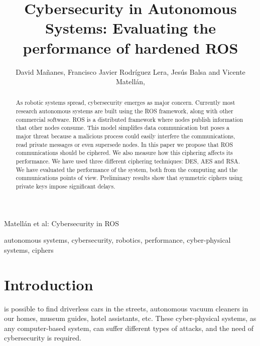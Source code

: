 \documentclass[journal,twoside]{JoPhA}
\begin{document}
\title{Cybersecurity in Autonomous Systems: Evaluating the performance of hardened ROS}

\author{David Ma\~nanes, Francisco Javier Rodr\'iguez Lera, Jes\'us Balsa and Vicente Matell\'an,
}

%
{Matell\'an et al: Cybersecurity in ROS}
\maketitle


\begin{abstract}
As robotic systems spread, cybersecurity emerges as major concern. Currently most research autonomous systems are built using the ROS framework, along with other commercial software. 
ROS is a distributed framework where nodes publish information that other nodes consume. 
This model simplifies data communication but poses a major threat because a malicious process could easily interfere the communications, read private messages or even supersede nodes. In this paper we propose that ROS communications should be ciphered. We also measure how this ciphering affects its performance. We have used three different ciphering techniques: DES, AES and RSA. We have evaluated the performance of the system, both from the computing and the communications points of view. Preliminary results show that symmetric ciphers using private keys impose significant delays.

\end{abstract}


\begin{IEEEkeywords}
autonomous systems, cybersecurity, robotics, performance, cyber-physical systems, ciphers
\end{IEEEkeywords}


\section{Introduction}


 is possible to find driverless cars in the streets, autonomous vacuum cleaners in our homes, museum guides, hotel assistants, etc. These cyber-physical systems, as any computer-based system, can suffer different types of attacks, and the need of cybersecurity \cite{Morante2015} is required. 
\end{document}
